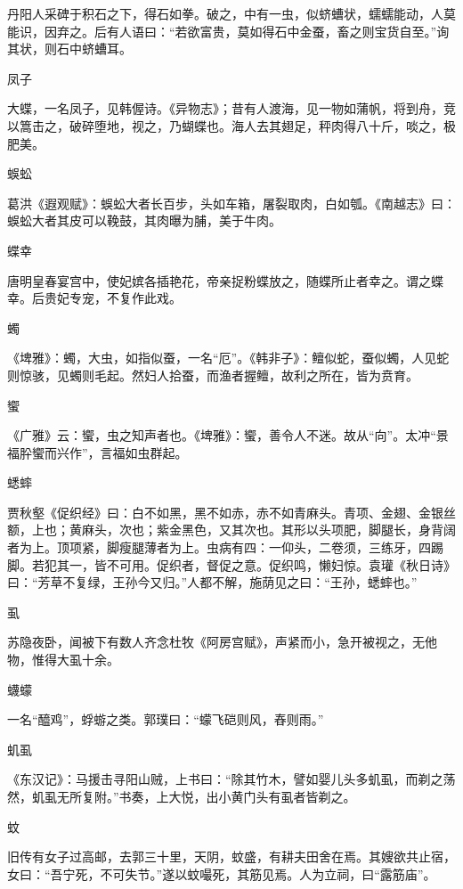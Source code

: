 \documentclass[a4paper,12pt,UTF8,twoside]{ctexbook}
\begin{document}
    丹阳人采碑于积石之下，得石如拳。破之，中有一虫，似蛴螬状，蠕蠕能动，人莫能识，因弃之。后有人语曰：“若欲富贵，莫如得石中金蚕，畜之则宝货自至。”询其状，则石中蛴螬耳。
    
    凤子
    
    大蝶，一名凤子，见韩偓诗。《异物志》；昔有人渡海，见一物如蒲帆，将到舟，竞以篙击之，破碎堕地，视之，乃蝴蝶也。海人去其翅足，秤肉得八十斤，啖之，极肥美。
    
    蜈蚣
    
    葛洪《遐观赋》：蜈蚣大者长百步，头如车箱，屠裂取肉，白如瓠。《南越志》曰：蜈蚣大者其皮可以鞔鼓，其肉曝为脯，美于牛肉。
    
    蝶幸
    
    唐明皇春宴宫中，使妃嫔各插艳花，帝亲捉粉蝶放之，随蝶所止者幸之。谓之蝶幸。后贵妃专宠，不复作此戏。
    
    蠋
    
    《埤雅》：蠋，大虫，如指似蚕，一名“厄”。《韩非子》：鳣似蛇，蚕似蠋，人见蛇则惊骇，见蠋则毛起。然妇人拾蚕，而渔者握鳣，故利之所在，皆为贲育。
    
    蠁
    
    《广雅》云：蠁，虫之知声者也。《埤雅》：蠁，善令人不迷。故从“向”。太冲“景福肸蠁而兴作”，言福如虫群起。
    
    蟋蟀
    
    贾秋壑《促织经》曰：白不如黑，黑不如赤，赤不如青麻头。青项、金翅、金银丝额，上也；黄麻头，次也；紫金黑色，又其次也。其形以头项肥，脚腿长，身背阔者为上。顶项紧，脚瘦腿薄者为上。虫病有四：一仰头，二卷须，三练牙，四踢脚。若犯其一，皆不可用。促织者，督促之意。促织鸣，懒妇惊。袁瓘《秋日诗》曰：“芳草不复绿，王孙今又归。”人都不解，施荫见之曰：“王孙，蟋蟀也。”
    
    虱
    
    苏隐夜卧，闻被下有数人齐念杜牧《阿房宫赋》，声紧而小，急开被视之，无他物，惟得大虱十余。
    
    蠛蠓
    
    一名“醯鸡”，蜉蝣之类。郭璞曰：“蠓飞硙则风，舂则雨。”
    
    虮虱
    
    《东汉记》：马援击寻阳山贼，上书曰：“除其竹木，譬如婴儿头多虮虱，而剃之荡然，虮虱无所复附。”书奏，上大悦，出小黄门头有虱者皆剃之。
    
    蚊
    
    旧传有女子过高邮，去郭三十里，天阴，蚊盛，有耕夫田舍在焉。其嫂欲共止宿，女曰：“吾宁死，不可失节。”遂以蚊嘬死，其筋见焉。人为立祠，曰“露筋庙”。
    
\end{document}
